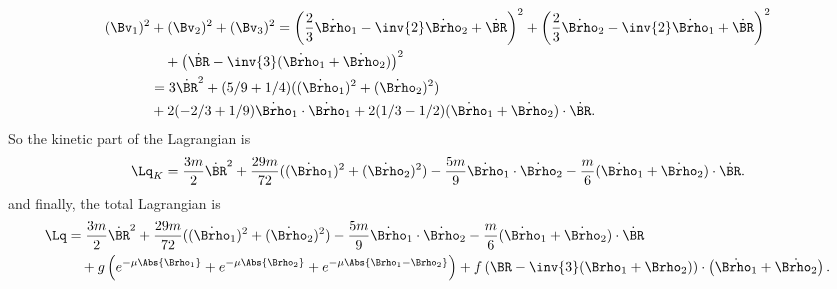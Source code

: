 {\begin{equation}
\begin{aligned}
(\Bv_1)^2
&+(\Bv_2)^2
+(\Bv_3)^2 %
= \left(\frac{2}{3} \dot{\Brho}_1 - \inv{2} \dot{\Brho}_2 + \dot{\BR}\right)^2
+ \left(\frac{2}{3} \dot{\Brho}_2 - \inv{2} \dot{\Brho}_1 + \dot{\BR}\right)^2  \\
&\quad+ \left(\dot{\BR} - \inv{3}(\dot{\Brho}_1 + \dot{\Brho}_2)\right)^2 \\
&=
 3 \dot{\BR}^2 + (5/9 + 1/4) ((\dot{\Brho}_1)^2 + (\dot{\Brho}_2)^2 ) \\
&+ 2 (-2/3 + 1/9) \dot{\Brho}_1 \cdot \dot{\Brho}_1
+ 2 (1/3-1/2) (\dot{\Brho}_1 + \dot{\Brho}_2) \cdot \dot{\BR}  .
\end{aligned}
\end{equation}
%
So the kinetic part of the Lagrangian is
%
\begin{equation}\label{eqn:goldsteinCh12:160}
\Lq_K = \frac{3m}{2} \dot{\BR}^2 + \frac{29 m}{72} ((\dot{\Brho}_1)^2 + (\dot{\Brho}_2)^2 )
- \frac{5 m}{9} \dot{\Brho}_1 \cdot \dot{\Brho}_2
- \frac{m}{6} (\dot{\Brho}_1 + \dot{\Brho}_2) \cdot \dot{\BR}  .
\end{equation}
%
and finally, the total Lagrangian is
%
\begin{equation}\label{eqn:goldsteinCh12:180}
\begin{aligned}
\Lq &=
\frac{3m}{2} \dot{\BR}^2 + \frac{29 m}{72} ((\dot{\Brho}_1)^2 + (\dot{\Brho}_2)^2 )
- \frac{5 m}{9} \dot{\Brho}_1 \cdot \dot{\Brho}_2
- \frac{m}{6} (\dot{\Brho}_1 + \dot{\Brho}_2) \cdot \dot{\BR} \\
&\quad
+g \left( e^{-\mu \Abs{\Brho_1}} + e^{-\mu \Abs{\Brho_2}} + e^{-\mu \Abs{ \Brho_1 - \Brho_2 }} \right)
+ f \left(\BR - \inv{3}(\Brho_1 + \Brho_2) \right) \cdot \left( \dot{\Brho_1} + \dot{\Brho_2} \right).
\end{aligned}
\end{equation}
%
}
